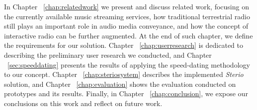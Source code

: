 In Chapter ~\ref{chap:relatedwork} we present and discuss related work, focusing on the currently available music streaming services, how traditional terrestrial radio still plays an important role in audio media conveyance, and how the concept of interactive radio can be further augmented. At the end of such chapter, we define the requirements for our solution. Chapter ~\ref{chap:userresearch} is dedicated to describing the preliminary user research we conducted, and Chapter ~\ref{sec:speeddating} presents the results of applying the speed-dating methodology to our concept. Chapter ~\ref{chap:steriosystem} describes the implemented \textit{Sterio} solution, and Chapter ~\ref{chap:evaluation} shows the evaluation conducted on prototypes and its results. Finally, in Chapter ~\ref{chap:conclusion}, we expose our conclusions on this work and reflect on future work.

